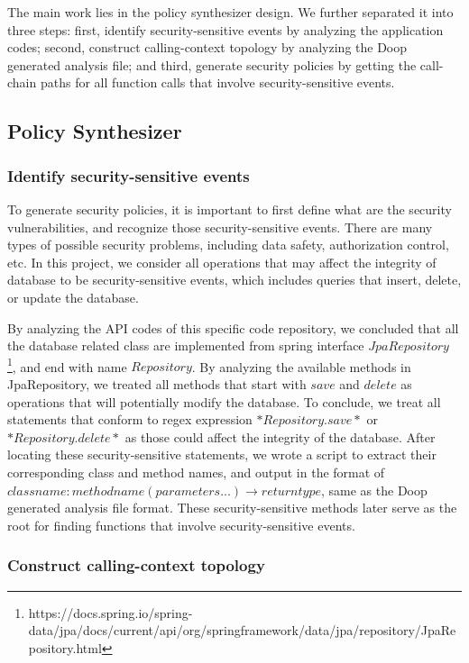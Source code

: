 The main work lies in the policy synthesizer design. We further separated it into three steps: first, identify security-sensitive events by analyzing the application codes; second, construct calling-context topology by analyzing the Doop generated analysis file; and third, generate security policies by getting the call-chain paths for all function calls that involve security-sensitive events.

\subsection{Policy Synthesizer}

\subsubsection{Identify security-sensitive events}
To generate security policies, it is important to first define what are the security vulnerabilities, and recognize those security-sensitive events. There are many types of possible security problems, including data safety, authorization control, etc. In this project, we consider all operations that may affect the integrity of database to be security-sensitive events, which includes queries that insert, delete, or update the database.

By analyzing the API codes of this specific code repository, we concluded that all the database related class are implemented from spring interface $JpaRepository$ \footnote{https://docs.spring.io/spring-data/jpa/docs/current/api/org/springframework/data/jpa/repository/JpaRepository.html}, and end with name $Repository$. By analyzing the available methods in JpaRepository, we treated all methods that start with $save$ and $delete$ as operations that will potentially modify the database. To conclude, we treat all statements that conform to regex expression $*Repository.save*$ or $*Repository.delete*$ as those could affect the integrity of the database. After locating these security-sensitive statements, we wrote a script to extract their corresponding class and method names, and output in the format of $classname:methodname(parameters...) \rightarrow return type$, same as the Doop generated analysis file format. These security-sensitive methods later serve as the root for finding functions that involve security-sensitive events. 


\subsubsection{Construct calling-context topology}

